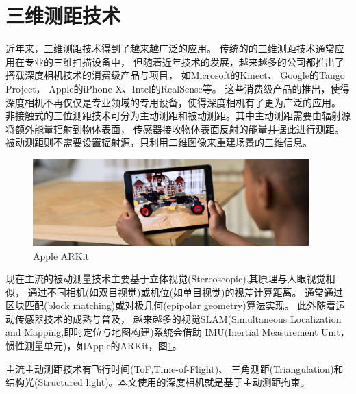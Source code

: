 \section{三维测距技术}
近年来，三维测距技术得到了越来越广泛的应用。
传统的的三维测距技术通常应用在专业的三维扫描设备中，
但随着近年技术的发展，越来越多的公司都推出了搭载深度相机技术的消费级产品与项目，
如Microsoft的Kinect\cite{microsoft_kinect}、
Google的Tango\cite{google_tango} Project，
Apple的iPhone X\cite{apple_iphoneX}、Intel的RealSense\cite{intel_realsense}等。
这些消费级产品的推出，使得深度相机不再仅仅是专业领域的专用设备，使得深度相机有了更为广泛的应用。
非接触式的三位测距技术可分为主动测距和被动测距。其中主动测距需要由辐射源将额外能量辐射到物体表面，
传感器接收物体表面反射的能量并据此进行测距。被动测距则不需要设置辐射源，只利用二维图像来重建场景的三维信息。
\begin{figure}[h]
    \centering
    \includegraphics[width=0.95\textwidth]{./Pictures/ARKit.eps}
    \caption{Apple ARKit}
    \label{arkit}
\end{figure}

现在主流的被动测量技术主要基于立体视觉(Stereoscopic),其原理与人眼视觉相似，
通过不同相机(如双目视觉)或机位(如单目视觉)的视差计算距离。
通常通过区块匹配(block matching)或对极几何(epipolar geometry)算法实现。
此外随着运动传感器技术的成熟与普及，
越来越多的视觉SLAM(Simultaneous Localization and Mapping,即时定位与地图构建)系统会借助
IMU(Inertial Measurement Unit，惯性测量单元)，如Apple的ARKit\cite{apple_arkit}，图\ref{arkit}。

主流主动测距技术有飞行时间(ToF,Time-of-Flight)、
三角测距(Triangulation)和结构光(Structured light)。本文使用的深度相机就是基于主动测距拘束。
